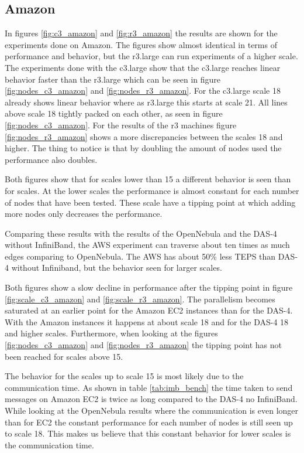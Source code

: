 \subsection{Amazon}
\label{res:amazon}
In figures \ref{fig:c3_amazon} and \ref{fig:r3_amazon} the results are shown for the experiments done on Amazon. The figures show almost identical in terms of performance and behavior, but the r3.large can run experiments of a higher scale. The experiments done with the c3.large show that the c3.large reaches linear behavior faster than the r3.large which can be seen in figure \ref{fig:nodes_c3_amazon} and \ref{fig:nodes_r3_amazon}. For the c3.large scale 18 already shows linear behavior where as r3.large this starts at scale 21. All lines above scale 18 tightly packed on each other, as seen in figure \ref{fig:nodes_c3_amazon}.
 For the results of the r3 machines figure \ref{fig:nodes_r3_amazon} shows a more discrepancies between the scales 18 and higher. The thing to notice is that by doubling the amount of nodes used the performance also doubles.
 
Both figures show that for scales lower than 15 a different behavior is seen than for scales. At the lower scales the performance is almost constant for each number of nodes that have been tested. These scale have a tipping point at which adding more nodes only decreases the performance. 

Comparing these results with the results of the OpenNebula and the DAS-4 without InfiniBand, the AWS experiment can traverse about ten times as much edges comparing to OpenNebula. The AWS has about 50\% less TEPS than DAS-4 without Infiniband, but the behavior seen for larger scales.

 Both figures show a slow decline in performance after the tipping point in figure \ref{fig:scale_c3_amazon} and \ref{fig:scale_r3_amazon}. The parallelism becomes saturated at an earlier point for the Amazon EC2 instances than for the DAS-4. With the Amazon instances it happens at about scale 18 and for the DAS-4 18 and higher scales. Furthermore, when looking at the figures \ref{fig:nodes_c3_amazon} and \ref{fig:nodes_r3_amazon} the tipping point has not been reached for scales above 15. 
 
 The behavior for the scales up to scale 15 is most likely due to the communication time. As shown in table \ref{tab:imb_bench} the time taken to send messages on Amazon EC2 is twice as long compared to the DAS-4 no InfiniBand. While looking at the OpenNebula results where the communication is even longer than for EC2 the constant performance for each number of nodes is still seen up to scale 18. This makes us believe that this constant behavior for lower scales is the communication time.

